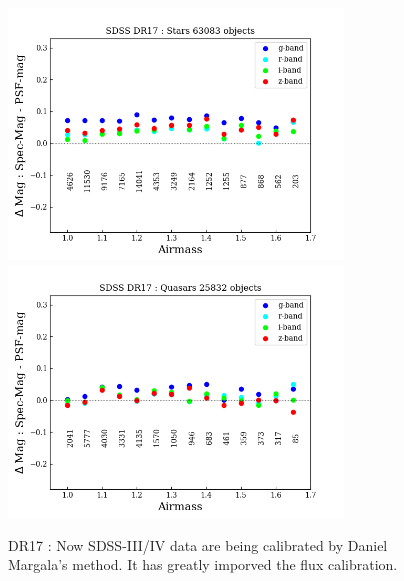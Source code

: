 \documentclass[apj,twocolumn]{aastex631}
\begin{document}
\begin{figure}%
\begin{center}
\includegraphics[angle=0,width=8.9cm]{figures/20220810_airmass_vs_dmag_dr17star.png}
\includegraphics[angle=0,width=8.9cm]{figures/20220810_airmass_vs_dmag_dr17quasar.png}
\caption{DR17 : Now SDSS-III/IV data are being calibrated by Daniel Margala's method.  It has greatly imporved the flux calibration.}
\end{center}
\end{figure}
\end{document}
